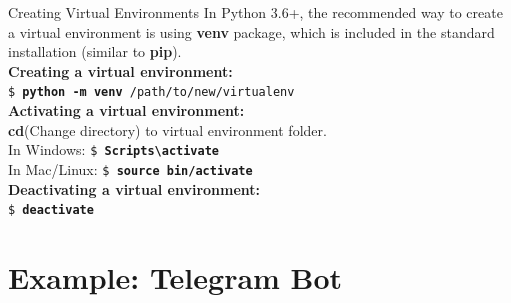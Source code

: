     \begin{frame}{Creating Virtual Environments}
        \LARGE
        \pause
        In Python 3.6+, the recommended way to create a virtual environment is using \textbf{venv} package, which is included in the standard installation (similar to \textbf{pip}).\\
        \pause
        \textbf{Creating a virtual environment:}\\
        \texttt{\$ \textbf{python -m venv} /path/to/new/virtualenv}\\
        \pause
        \textbf{Activating a virtual environment:}\\
        \textbf{cd}(Change directory) to virtual environment folder.\\
        In Windows: \texttt{\$ \textbf{Scripts\textbackslash activate}}\\
        In Mac/Linux: \texttt{\$ \textbf{source bin/activate}}\\
        \pause
        \textbf{Deactivating a virtual environment:}\\
        \texttt{\$ \textbf{deactivate}}
    \end{frame}

    \section{Example: Telegram Bot}
    
    \begin{frame}{}
    
        
    
    \end{frame}

    \begin{frame}{}
    
        
    \end{frame}
    
